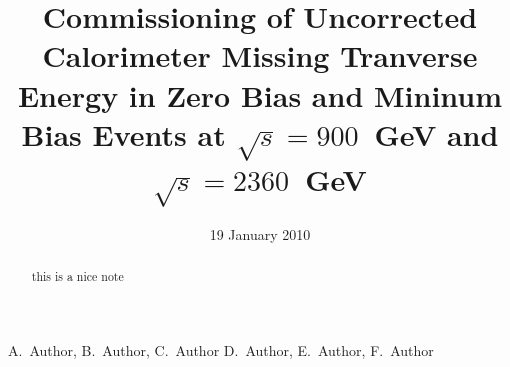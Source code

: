 
\begin{titlepage}


   \date{19 January 2010}

  \title{Commissioning of Uncorrected Calorimeter Missing Tranverse Energy in Zero Bias and Mininum Bias Events at $\sqrt{s}=900$~GeV and $\sqrt{s}=2360$~GeV}

  \begin{Authlist}
    A.~Author, B.~Author, C.~Author
    D.~Author, E.~Author, F.~Author
  \end{Authlist}



  \begin{abstract}
this is a nice note
  \end{abstract} 

  
\end{titlepage}

\setcounter{page}{2}%

%
%
%
%
%  
%
